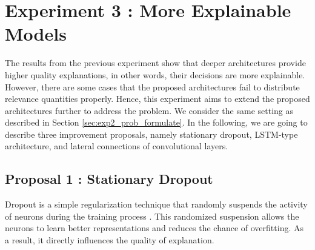 \section{Experiment 3 : More Explainable Models}
The results from the previous experiment show that deeper architectures provide higher quality explanations, in other words, their decisions are more explainable. However, there are some cases that the proposed architectures fail to distribute relevance quantities properly.  Hence, this experiment aims to extend the proposed architectures further to address the problem. We consider the same setting as described in Section \ref{sec:exp2_prob_formulate}. In the following, we are going to describe three improvement proposals, namely stationary dropout, LSTM-type architecture,  and lateral connections of convolutional layers.


\subsection{Proposal 1 :  Stationary Dropout}
Dropout is a simple regularization technique that randomly suspends the activity of neurons during the training process \citep{SrivastavaDropoutSimpleWay2014} . This randomized suspension allows the neurons to learn better representations and reduces the chance of overfitting.  As a result, it directly influences the quality of explanation. 





\begin{figure}[!htb]
\centering
{} 

\label{fig:dropout_lstm}
\end{figure}

